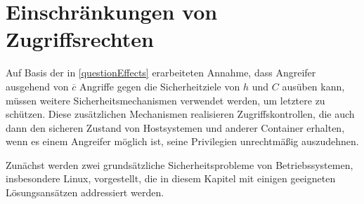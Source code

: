 \documentclass[../main.tex]{subfiles}
\begin{document}
{		%






  \section{Einschränkungen von Zugriffsrechten}
		\label{secAccessControls}

		Auf Basis der in \ref{questionEffects} erarbeiteten Annahme, dass Angreifer ausgehend von \(\overline{c}\) Angriffe gegen die Sicherheitziele von \(h\) und \(C\) ausüben kann, müssen weitere Sicherheitsmechanismen verwendet werden, um letztere zu schützen. Diese zusätzlichen Mechanismen realisieren Zugriffskontrollen, die auch dann den sicheren Zustand von Hostsystemen und anderer Container erhalten, wenn es einem Angreifer möglich ist, seine Privilegien unrechtmäßig auszudehnen.

		Zunächst werden zwei grundsätzliche Sicherheitsprobleme von Betriebssystemen, insbesondere Linux, vorgestellt, die in diesem Kapitel mit einigen geeigneten Lösungsansätzen addressiert werden.

}
\end{document}
